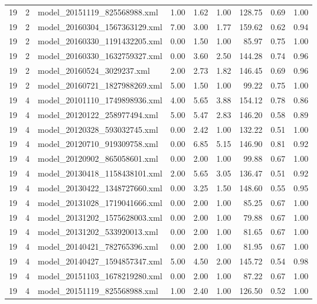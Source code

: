 \begin{table}[ht]
\begin{tabular}{rrlrrrrrr}
   19 &   2 & model\_20151119\_825568988.xml & 1.00 & 1.62 & 1.00 & 128.75 & 0.69 & 1.00 \\ 
   19 &   2 & model\_20160304\_1567363129.xml & 7.00 & 3.00 & 1.77 & 159.62 & 0.62 & 0.94 \\ 
   19 &   2 & model\_20160330\_1191432205.xml & 0.00 & 1.50 & 1.00 & 85.97 & 0.75 & 1.00 \\ 
   19 &   2 & model\_20160330\_1632759327.xml & 0.00 & 3.60 & 2.50 & 144.28 & 0.74 & 0.96 \\ 
   19 &   2 & model\_20160524\_3029237.xml & 2.00 & 2.73 & 1.82 & 146.45 & 0.69 & 0.96 \\ 
   19 &   2 & model\_20160721\_1827988269.xml & 5.00 & 1.50 & 1.00 & 99.22 & 0.75 & 1.00 \\ 
   19 &   4 & model\_20101110\_1749898936.xml & 4.00 & 5.65 & 3.88 & 154.12 & 0.78 & 0.86 \\ 
   19 &   4 & model\_20120122\_258977494.xml & 5.00 & 5.47 & 2.83 & 146.20 & 0.58 & 0.89 \\ 
   19 &   4 & model\_20120328\_593032745.xml & 0.00 & 2.42 & 1.00 & 132.22 & 0.51 & 1.00 \\ 
   19 &   4 & model\_20120710\_919309758.xml & 0.00 & 6.85 & 5.15 & 146.90 & 0.81 & 0.92 \\ 
   19 &   4 & model\_20120902\_865058601.xml & 0.00 & 2.00 & 1.00 & 99.88 & 0.67 & 1.00 \\ 
   19 &   4 & model\_20130418\_1158438101.xml & 2.00 & 5.65 & 3.05 & 136.47 & 0.51 & 0.92 \\ 
   19 &   4 & model\_20130422\_1348727660.xml & 0.00 & 3.25 & 1.50 & 148.60 & 0.55 & 0.95 \\ 
   19 &   4 & model\_20131028\_1719041666.xml & 0.00 & 2.00 & 1.00 & 85.25 & 0.67 & 1.00 \\ 
   19 &   4 & model\_20131202\_1575628003.xml & 0.00 & 2.00 & 1.00 & 79.88 & 0.67 & 1.00 \\ 
   19 &   4 & model\_20131202\_533920013.xml & 0.00 & 2.00 & 1.00 & 81.65 & 0.67 & 1.00 \\ 
   19 &   4 & model\_20140421\_782765396.xml & 0.00 & 2.00 & 1.00 & 81.95 & 0.67 & 1.00 \\ 
   19 &   4 & model\_20140427\_1594857347.xml & 5.00 & 4.50 & 2.00 & 145.72 & 0.54 & 0.98 \\ 
   19 &   4 & model\_20151103\_1678219280.xml & 0.00 & 2.00 & 1.00 & 87.22 & 0.67 & 1.00 \\ 
   19 &   4 & model\_20151119\_825568988.xml & 1.00 & 2.40 & 1.00 & 126.50 & 0.52 & 1.00 \\ 

\end{tabular}
\end{table}
